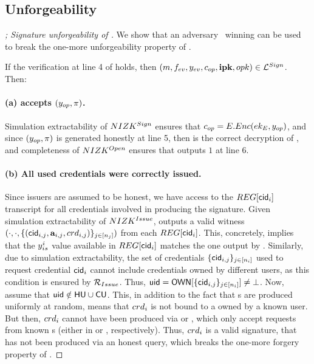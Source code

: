 
\subsection{Unforgeability}

\begin{proof}[; Signature unforgeability of \CUASGen]
  We show that an adversary \adv~winning \ExpForge can be used to break the
  one-more unforgeability property of \SBCM.
 
  If the verification at line 4 of \ExpForge holds, then $(m,f_{ev},
  y_{ev},c_{op},\mathbf{ipk},opk) \in \mathcal{L}^{Sign}$. Then:

  \paragraph{(a) \Judge accepts $(y_{op},\pi)$.} %
  Simulation extractability of $NIZK^{Sign}$ ensures that $c_{op} =
  E.Enc(ek_{E},y_{op})$, and since $(y_{op},\pi)$ is generated honestly at
  line 5, then \yinsp is the correct decryption of \cinsp, and completeness of
  $NIZK^{Open}$ ensures that \Judge outputs $1$ at line 6.

  \paragraph{(b) All used credentials were correctly issued.} %
  Since issuers are assumed to be honest, we have access to the $\trans[\cid_i]$
  transcript for all credentials involved in producing the signature. Given
  simulation extractability of $NIZK^{Issue}$, \ExtractIssue outputs a valid
  witness $(\cdot,\cdot,\lbrace(\mathsf{cid}_{i,j},\mathbf{a}_{i,j},crd_{i,j})
  \rbrace_{j\in[n_j]})$ from each $\trans[\cid_i]$. This, concretely, implies
  that the $y_{is}^i$ value available in $\trans[\cid_i]$ matches the one
  output by \fissue. Similarly, due to simulation extractability, the set of
  credentials $\lbrace \mathsf{cid}_{i,j}\rbrace_{j\in[n_i]}$ used to request credential
  $\mathsf{cid}_i$ cannot include credentials owned by different users, as this
  condition is ensured by $\mathcal{R}_{Issue}$. Thus, $\mathsf{uid} = \mathsf{OWN}[\lbrace
  \mathsf{cid}_{i,j} \rbrace_{j\in[n_i]}] \neq \bot$. Now, assume that $\mathsf{uid} \notin \mathsf{HU}
  \cup \mathsf{CU}$. This, in addition to the fact that {\usk}s are produced uniformly
  at random, means that $crd_i$ is not bound to a \usk owned by a known
  user. But then, $crd_i$ cannot have been produced via \OBTISS or \ISSUE,
  which only accept requests from known {\uid}s (either in \HU or \CU,
  respectively). Thus, $crd_i$ is a valid \SBCM signature, that has not been
  produced via an honest query, which breaks the one-more forgery property of
  \SBCM.


\end{proof}
